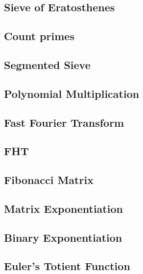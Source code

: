 \subsection{Sieve of Eratosthenes}
\raggedbottom
\hrulefill
\subsection{Count primes}
\raggedbottom
\hrulefill
\subsection{Segmented Sieve}
\raggedbottom
\hrulefill
\subsection{Polynomial Multiplication}
\raggedbottom
\hrulefill
\subsection{Fast Fourier Transform}
\raggedbottom
\hrulefill
\subsection{FHT}
\raggedbottom
\hrulefill
\subsection{Fibonacci Matrix}
\raggedbottom
\hrulefill
\subsection{Matrix Exponentiation}
\raggedbottom
\hrulefill
\subsection{Binary Exponentiation}
\raggedbottom
\hrulefill
\subsection{Euler's Totient Function}
\raggedbottom
\hrulefill

